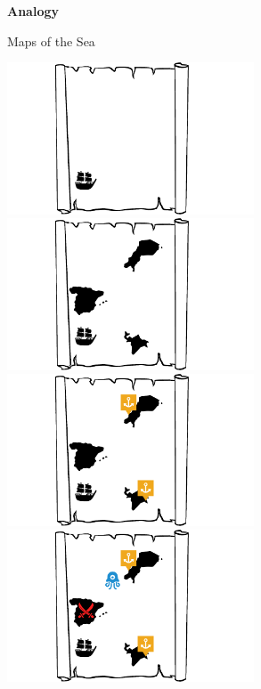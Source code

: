 \documentclass[en,16:9,smallfoot]{sdqbeamer}
\begin{document}
   \begin{frame}[plain]
        \vspace{0.7cm}
        \begin{infobox-map}
        \centering
        \begin{Huge}
        \textbf{Analogy}\\
        \end{Huge}
        \end{infobox-map}
   \end{frame}

   \begin{frame}{Maps of the Sea}
       \begin{overprint}
            \centering\includegraphics[width=0.55\textwidth]{imgs/schema_analogy_00}
            \centering\includegraphics[width=0.55\textwidth]{imgs/schema_analogy_01}
            \centering\includegraphics[width=0.55\textwidth]{imgs/schema_analogy_02}
            \centering\includegraphics[width=0.55\textwidth]{imgs/schema_analogy_03}

\end{overprint}
\end{frame}
\end{document}
